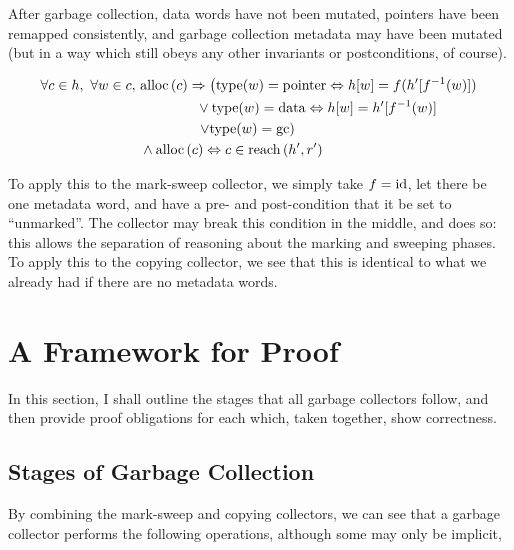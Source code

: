 \begin{definition}[Preservation]
  \label{def:g-preservation}
  After garbage collection, data words have not been mutated, pointers
  have been remapped consistently, and garbage collection metadata may
  have been mutated (but in a way which still obeys any other
  invariants or postconditions, of course).

  \begin{align*}
    \forall c \in h,\ \forall w \in c,\ &\mathrm{alloc}\left(c\right) \Rightarrow
    \left(\mathrm{type}(w) = \mathrm{pointer} \Leftrightarrow h[w] = f(h'[f^{-1}(w)])\right.\\
    &\quad\quad\quad\quad \lor \mathrm{type}(w) = \mathrm{data}
    \Leftrightarrow h[w] = h'[f^{-1}(w)]\\
    &\quad\quad\quad\quad \left.\lor \mathrm{type}(w) = \mathrm{gc}\right)\\
    &\land \mathrm{alloc}\left(c\right) \Leftrightarrow c \in \mathrm{reach}\left(h', r'\right)
  \end{align*}
\end{definition}

To apply this to the mark-sweep collector, we simply take $f = \mathrm{id}$,
let there be one metadata word, and have a pre- and post-condition
that it be set to ``unmarked''. The collector may break this condition
in the middle, and does so: this allows the separation of reasoning
about the marking and sweeping phases. To apply this to the copying
collector, we see that this is identical to what we already had if
there are no metadata words.

\section{A Framework for Proof}
\label{sec:gc-framework}

In this section, I shall outline the stages that all garbage
collectors follow, and then provide proof obligations for each which,
taken together, show correctness.

\subsection{Stages of Garbage Collection}
\label{sec:gc-framework-stages}

By combining the mark-sweep and copying collectors, we can see that
a garbage collector performs the following operations, although some
may only be implicit,

